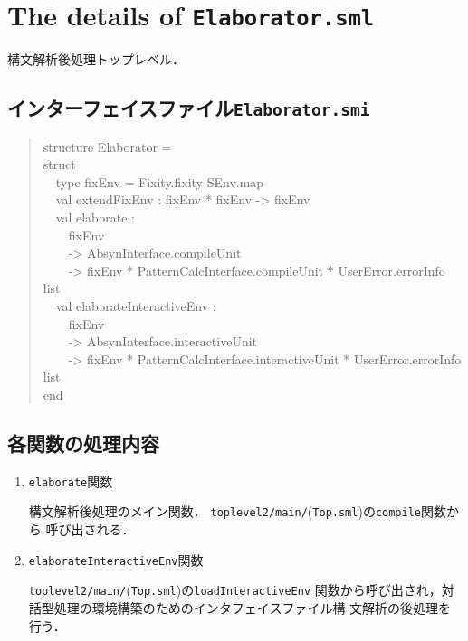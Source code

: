 \documentclass{jbook}
\newcommand{\txt}[2]{#2}
\newcommand{\code}[1]{\mbox{\large\tt #1}}
\newcommand{\module}[2]{\code{#1}(\code{#2})}
\newcommand{\myem}{\mbox{\ \ }}
\newenvironment{program}{\begin{quote}\begin{tt}}%
                        {\end{tt}\end{quote}}
\begin{document}
\section{\txt{\code{Elaborator.sml}の処理の詳細}{The details of \code{Elaborator.sml}}}
\ifjp%
	構文解析後処理トップレベル．
\subsection{インターフェイスファイル\code{Elaborator.smi}}
\begin{program}
structure Elaborator =\\
struct\\
\myem   type fixEnv = Fixity.fixity SEnv.map\\
\myem   val extendFixEnv : fixEnv * fixEnv -> fixEnv\\
\myem   val elaborate :\\
\myem \myem       fixEnv\\
\myem \myem       -> AbsynInterface.compileUnit\\
\myem \myem       -> fixEnv * PatternCalcInterface.compileUnit * UserError.errorInfo list\\
\myem   val elaborateInteractiveEnv :\\
\myem \myem       fixEnv\\
\myem \myem       -> AbsynInterface.interactiveUnit\\
\myem \myem       -> fixEnv * PatternCalcInterface.interactiveUnit * UserError.errorInfo list\\
end
\end{program}

\subsection{各関数の処理内容}
\begin{enumerate}
\item \code{elaborate}関数

	構文解析後処理のメイン関数．
	\module{toplevel2/main/}{Top.sml}の\code{compile}関数から
呼び出される．

\item \code{elaborateInteractiveEnv}関数

	\module{toplevel2/main/}{Top.sml}の\code{loadInteractiveEnv}
関数から呼び出され，対話型処理の環境構築のためのインタフェイスファイル構
文解析の後処理を行う．

\end{enumerate}
\else%
\fi%
\end{document}
